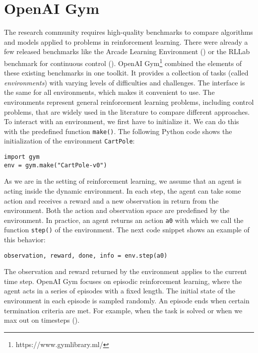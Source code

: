 
\section{OpenAI Gym}
\label{sec:gym}
The research community requires high-quality benchmarks to compare algorithms and models applied to problems in reinforcement learning. There were already a few released benchmarks like the Arcade Learning Environment (\cite{bellemare2013arcade}) or the RLLab benchmark for continuous control (\cite{duan2016benchmarking}). OpenAI Gym\footnote{https://www.gymlibrary.ml/} combined the elements of these existing benchmarks in one toolkit. It provides a collection of tasks (called \textit{environments}) with varying levels of difficulties and challenges. The interface is the same for all environments, which makes it convenient to use. The environments represent general reinforcement learning problems, including control problems, that are widely used in the literature to compare different approaches. To interact with an environment, we first have to initialize it. We can do this with the predefined function \verb|make()|. The following Python code shows the initialization of the environment \verb|CartPole|:
\begin{verbatim}
import gym
env = gym.make("CartPole-v0")
\end{verbatim}
As we are in the setting of reinforcement learning, we assume that an agent is acting inside the dynamic environment. In each step, the agent can take some action and receives a reward and a new observation in return from the environment. Both the action and observation space are predefined by the environment. In practice, an agent returns an action \verb|a0| with which we call the function \verb|step()| of the environment. The next code snippet shows an example of this behavior:
\begin{verbatim}
observation, reward, done, info = env.step(a0)
\end{verbatim}
The observation and reward returned by the environment applies to the current time step. OpenAI Gym focuses on episodic reinforcement learning, where the agent acts in a series of episodes with a fixed length. The initial state of the environment in each episode is sampled randomly. An episode ends when certain termination criteria are met. For example, when the task is solved or when we max out on timesteps (\cite{1606.01540}).


